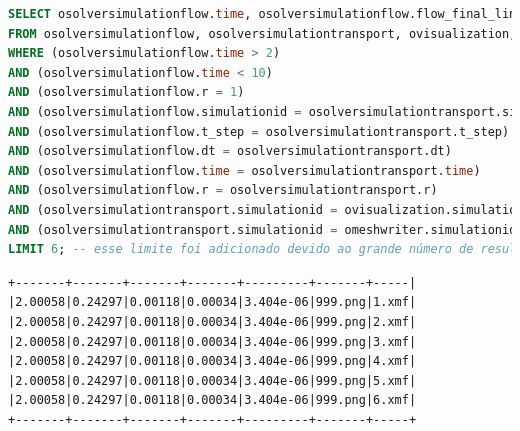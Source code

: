 \begin{lstlisting}[language=sql,deletendkeywords={TIME},label={lst:experiments-3b-sql},caption={[Código em SQL gerado na consulta~\#3B]Código em SQL gerado na consulta~\#3B. Tempo médio de geração: 34,36~ms.}]
SELECT osolversimulationflow.time, osolversimulationflow.flow_final_linear_residual, osolversimulationflow.flow_norm_delta_u, osolversimulationtransport.transport_final_linear_residual, osolversimulationtransport.transport_norm_delta_u, ovisualization.png, omeshwriter.xdmf
FROM osolversimulationflow, osolversimulationtransport, ovisualization, omeshwriter
WHERE (osolversimulationflow.time > 2) 
AND (osolversimulationflow.time < 10) 
AND (osolversimulationflow.r = 1) 
AND (osolversimulationflow.simulationid = osolversimulationtransport.simulationid) 
AND (osolversimulationflow.t_step = osolversimulationtransport.t_step) 
AND (osolversimulationflow.dt = osolversimulationtransport.dt) 
AND (osolversimulationflow.time = osolversimulationtransport.time) 
AND (osolversimulationflow.r = osolversimulationtransport.r) 
AND (osolversimulationtransport.simulationid = ovisualization.simulationid) 
AND (osolversimulationtransport.simulationid = omeshwriter.simulationid)
LIMIT 6; -- esse limite foi adicionado devido ao grande número de resultados dessa consulta
\end{lstlisting}

\begin{lstlisting}[language=sqlresults,label={lst:experiments-3b-sqlresults},caption={[Versão simplificada dos resultados da consulta \#3B.]Resultados da consulta \#3B. Tempo médio de execução: 19,85~ms.}]
+-------+-------+-------+-------+---------+-------+-----|
|2.00058|0.24297|0.00118|0.00034|3.404e-06|999.png|1.xmf|
|2.00058|0.24297|0.00118|0.00034|3.404e-06|999.png|2.xmf|
|2.00058|0.24297|0.00118|0.00034|3.404e-06|999.png|3.xmf|
|2.00058|0.24297|0.00118|0.00034|3.404e-06|999.png|4.xmf|
|2.00058|0.24297|0.00118|0.00034|3.404e-06|999.png|5.xmf|
|2.00058|0.24297|0.00118|0.00034|3.404e-06|999.png|6.xmf|
+-------+-------+-------+-------+---------+-------+-----+
\end{lstlisting}

